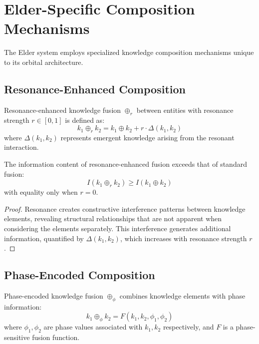 \section{Elder-Specific Composition Mechanisms}

The Elder system employs specialized knowledge composition mechanisms unique to its orbital architecture.

\subsection{Resonance-Enhanced Composition}

\begin{definition}
Resonance-enhanced knowledge fusion $\oplus_r$ between entities with resonance strength $r \in [0, 1]$ is defined as:
\begin{equation}
k_1 \oplus_r k_2 = k_1 \oplus k_2 + r \cdot \Delta(k_1, k_2)
\end{equation}
where $\Delta(k_1, k_2)$ represents emergent knowledge arising from the resonant interaction.
\end{definition}

\begin{theorem}
The information content of resonance-enhanced fusion exceeds that of standard fusion:
\begin{equation}
I(k_1 \oplus_r k_2) \geq I(k_1 \oplus k_2)
\end{equation}
with equality only when $r = 0$.
\end{theorem}

\begin{proof}
Resonance creates constructive interference patterns between knowledge elements, revealing structural relationships that are not apparent when considering the elements separately. This interference generates additional information, quantified by $\Delta(k_1, k_2)$, which increases with resonance strength $r$.
\end{proof}

\subsection{Phase-Encoded Composition}

\begin{definition}
Phase-encoded knowledge fusion $\oplus_\phi$ combines knowledge elements with phase information:
\begin{equation}
k_1 \oplus_\phi k_2 = F(k_1, k_2, \phi_1, \phi_2)
\end{equation}
where $\phi_1, \phi_2$ are phase values associated with $k_1, k_2$ respectively, and $F$ is a phase-sensitive fusion function.
\end{definition}

